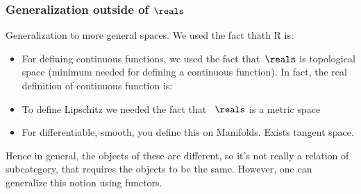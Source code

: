 {    \subsubsection{Generalization outside of $\reals$}
    Generalization to more general spaces.
    We used the fact thath R is:
    \begin{itemize}
        \item For defining continuous functions, we used the fact that~$\reals$ is topological space (minimum needed for defining a continuous function).
              In fact, the real definition of continuous function is:


        \item To define Lipschitz we needed the fact that~ $\reals$ is a metric space
        \item For differentiable, smooth, you define this on Manifolds.
              Exists tangent space.
    \end{itemize}

    Hence in general, the objects of these are different, so it's not really a relation of subcategory, that requires the objects to be the same.
    However, one can generalize this notion using functors.

}
